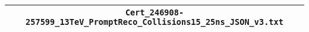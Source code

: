 \begin{center}
\begin{tabular}{c}
\hline\hline
 \verb!Cert_246908-257599_13TeV_PromptReco_Collisions15_25ns_JSON_v3.txt!\tabularnewline
\hline
\end{tabular}\end{center}
